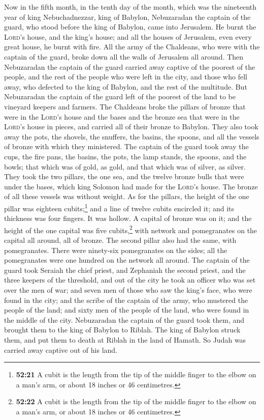  Now in the fifth month, in the tenth day of the month,
which was the nineteenth year of king Nebuchadnezzar, king of Babylon,
Nebuzaradan the captain of the guard, who stood before the king of
Babylon, came into Jerusalem.  He burnt the
\textsc{Lord}'s house, and the king's house; and all the houses of
Jerusalem, even every great house, he burnt with fire. 
All the army of the Chaldeans, who were with the captain of the guard,
broke down all the walls of Jerusalem all around.  Then
Nebuzaradan the captain of the guard carried away captive of the poorest
of the people, and the rest of the people who were left in the city, and
those who fell away, who defected to the king of Babylon, and the rest
of the multitude.  But Nebuzaradan the captain of the
guard left of the poorest of the land to be vineyard keepers and
farmers.  The Chaldeans broke the pillars of bronze that
were in the \textsc{Lord}'s house and the bases and the bronze sea that
were in the \textsc{Lord}'s house in pieces, and carried all of their
bronze to Babylon.  They also took away the pots, the
shovels, the snuffers, the basins, the spoons, and all the vessels of
bronze with which they ministered.  The captain of the
guard took away the cups, the fire pans, the basins, the pots, the lamp
stands, the spoons, and the bowls; that which was of gold, as gold, and
that which was of silver, as silver.  They took the two
pillars, the one sea, and the twelve bronze bulls that were under the
bases, which king Solomon had made for the \textsc{Lord}'s house. The
bronze of all these vessels was without weight.  As for
the pillars, the height of the one pillar was eighteen
cubits;\footnote{\textbf{52:21} A cubit is the length from the tip of
  the middle finger to the elbow on a man's arm, or about 18 inches or
  46 centimetres.} and a line of twelve cubits encircled it; and its
thickness was four fingers. It was hollow.  A capital of
bronze was on it; and the height of the one capital was five
cubits,\footnote{\textbf{52:22} A cubit is the length from the tip of
  the middle finger to the elbow on a man's arm, or about 18 inches or
  46 centimetres.} with network and pomegranates on the capital all
around, all of bronze. The second pillar also had the same, with
pomegranates.  There were ninety-six pomegranates on the
sides; all the pomegranates were one hundred on the network all around.
 The captain of the guard took Seraiah the chief priest,
and Zephaniah the second priest, and the three keepers of the threshold,
 and out of the city he took an officer who was set over
the men of war; and seven men of those who saw the king's face, who were
found in the city; and the scribe of the captain of the army, who
mustered the people of the land; and sixty men of the people of the
land, who were found in the middle of the city. 
Nebuzaradan the captain of the guard took them, and brought them to the
king of Babylon to Riblah.  The king of Babylon struck
them, and put them to death at Riblah in the land of Hamath. So Judah
was carried away captive out of his land.

